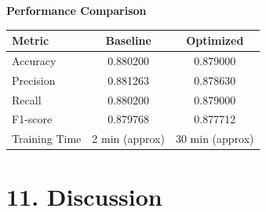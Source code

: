 \documentclass[11pt]{article}
\begin{document}
\textbf{Performance Comparison}
\begin{tabular}{|p{4cm}|c|c|}
\hline
Metric & Baseline & Optimized\\
\hline
Accuracy&0.880200&0.879000\\
Precision&0.881263&0.878630\\
Recall&0.880200&0.879000\\
F1-score&0.879768&0.877712\\
Training Time&2 min (approx)&30 min (approx)\\
\hline
\end{tabular}

\section*{11. Discussion}
\end{document}

